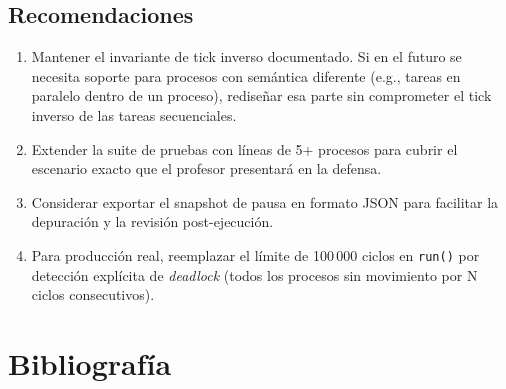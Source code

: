\documentclass[12pt,letterpaper]{article}
\begin{document}
\subsection{Recomendaciones}

\begin{enumerate}[leftmargin=2em, itemsep=6pt]
  \item Mantener el invariante de tick inverso documentado. Si en el futuro se necesita
    soporte para procesos con semántica diferente (e.g., tareas en paralelo dentro de un
    proceso), rediseñar esa parte sin comprometer el tick inverso de las tareas secuenciales.

  \item Extender la suite de pruebas con líneas de 5+ procesos para cubrir el escenario
    exacto que el profesor presentará en la defensa.

  \item Considerar exportar el snapshot de pausa en formato JSON para facilitar la
    depuración y la revisión post-ejecución.

  \item Para producción real, reemplazar el límite de 100\,000 ciclos en \texttt{run()}
    por detección explícita de \emph{deadlock} (todos los procesos sin movimiento por
    N ciclos consecutivos).
\end{enumerate}

\section{Bibliografía}
\end{document}
